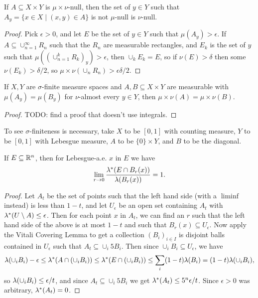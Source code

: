 \documentclass[letterpaper,11pt]{report}
\begin{document}
\begin{prop}\label{product-null} If $A \subseteq X\times Y$ is $\mu\times\nu$-null, then the set of $y \in Y$ such that $A_y = \{x \in X \mid (x,y) \in A\}$ is not $\mu$-null is $\nu$-null.
\end{prop}
\begin{proof} Pick $\epsilon > 0$, and let $E$ be the set of $y \in Y$ such that $\mu(A_y) > \epsilon$. If $A \subseteq \cup_{n=1}^\infty R_n$ such that the $R_n$ are measurable rectangles, and $E_k$ is the set of $y$ such that $\mu((\cup_{n=1}^k R_k)_y) > \epsilon$, then $\cup_k E_k = E$, so if $\nu(E) > \delta$ then some $\nu(E_k) > \delta/2$, so $\mu\times\nu(\cup_n R_n) > \epsilon\delta/2$.
\end{proof}

\begin{thm} If $X,Y$ are $\sigma$-finite measure spaces and $A,B \subseteq X\times Y$ are measurable with $\mu(A_y) = \mu(B_y)$ for $\nu$-almost every $y \in Y$, then $\mu\times\nu(A) = \mu\times\nu(B)$.
\end{thm}
\begin{proof} TODO: find a proof that doesn't use integrals.
\end{proof}

\begin{ex} To see $\sigma$-finiteness is necessary, take $X$ to be $[0,1]$ with counting measure, $Y$ to be $[0,1]$ with Lebesgue measure, $A$ to be $\{0\}\times Y$, and $B$ to be the diagonal.
\end{ex}

\begin{thm} If $E \subseteq \mathbb{R}^n$, then for Lebesgue-a.e. $x$ in $E$ we have
\[
\lim_{r \rightarrow 0} \frac{\lambda^*(E\cap B_r(x))}{\lambda(B_r(x))} = 1.
\]
\end{thm}
\begin{proof} Let $A_t$ be the set of points such that the left hand side (with a $\liminf$ instead) is less than $1-t$, and let $U_\epsilon$ be an open set containing $A_t$ with $\lambda^*(U\setminus A) \le \epsilon$. Then for each point $x$ in $A_t$, we can find an $r$ such that the left hand side of the above is at most $1-t$ and such that $B_r(x) \subseteq U_\epsilon$. Now apply the Vitali Covering Lemma to get a collection $(B_i)_{i \in I}$ is disjoint balls contained in $U_\epsilon$ such that $A_t \subseteq \cup_i 5B_i$. Then since $\cup_i B_i \subseteq U_\epsilon$, we have
\[
\lambda(\cup_i B_i)-\epsilon \le \lambda^*(A \cap (\cup_i B_i)) \le \lambda^*(E\cap (\cup_i B_i)) \le \sum_i (1-t)\lambda(B_i) = (1-t)\lambda(\cup_i B_i),
\]
so $\lambda(\cup_i B_i) \le \epsilon/t$, and since $A_t \subseteq \cup_i 5B_i$ we get $\lambda^*(A_t) \le 5^n\epsilon/t$. Since $\epsilon > 0$ was arbitrary, $\lambda^*(A_t) = 0$.
\end{proof}
\end{document}
